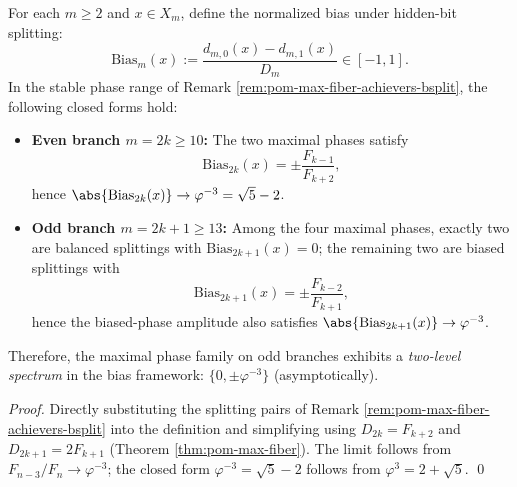 \begin{corollary}\label{cor:pom-max-fiber-hidden-bit-bias-spectrum}
For each \(m\ge 2\) and \(x\in X_m\), define the normalized bias under hidden-bit splitting:
\[
\mathrm{Bias}_m(x):=\frac{d_{m,0}(x)-d_{m,1}(x)}{D_m}\in[-1,1].
\]
In the stable phase range of Remark \ref{rem:pom-max-fiber-achievers-bsplit}, the following closed forms hold:
\begin{itemize}
  \item \textbf{Even branch \(m=2k\ge 10\):} The two maximal phases satisfy
  \[
  \mathrm{Bias}_{2k}(x)=\pm\frac{F_{k-1}}{F_{k+2}},
  \]
  hence \(\abs{\mathrm{Bias}_{2k}(x)}\to \varphi^{-3}=\sqrt5-2\).
  \item \textbf{Odd branch \(m=2k+1\ge 13\):} Among the four maximal phases, exactly two are balanced splittings with \(\mathrm{Bias}_{2k+1}(x)=0\); the remaining two are biased splittings with
  \[
  \mathrm{Bias}_{2k+1}(x)=\pm\frac{F_{k-2}}{F_{k+1}},
  \]
  hence the biased-phase amplitude also satisfies \(\abs{\mathrm{Bias}_{2k+1}(x)}\to \varphi^{-3}\).
\end{itemize}
Therefore, the maximal phase family on odd branches exhibits a \emph{two-level spectrum} in the bias framework: \(\{0,\pm\varphi^{-3}\}\) (asymptotically).
\end{corollary}
\begin{proof}
Directly substituting the splitting pairs of Remark \ref{rem:pom-max-fiber-achievers-bsplit} into the definition and simplifying using \(D_{2k}=F_{k+2}\) and \(D_{2k+1}=2F_{k+1}\) (Theorem \ref{thm:pom-max-fiber}).
The limit follows from \(F_{n-3}/F_n\to \varphi^{-3}\); the closed form \(\varphi^{-3}=\sqrt5-2\) follows from \(\varphi^3=2+\sqrt5\). \qed
\end{proof}

